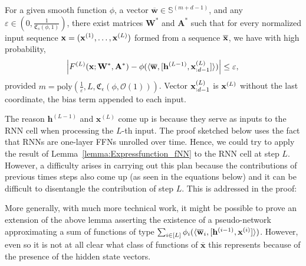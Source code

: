 \begin{lemma}[Informal]\label{lemma:Expressfunction_RNN}
	For a given smooth function $\phi$, a vector $\overline{\mathbf{w}} \in \mathbb{S}^{(m+d-1)}$, and any $\varepsilon \in \left(0, \frac{1}{\mathfrak{C}_{s}\left(\phi, 1 \right)}\right)$, there exist matrices $\mathbf{W}^{\ast}$ and $\mathbf{A}^{\ast}$ such that for every normalized input sequence $\mathbf{x} = (\mathbf{x}^{(1)}, \ldots, \mathbf{x}^{(L)})$ formed from a sequence $\overline{\mathbf{x}}$, we have with high probability,
	\begin{align*}
	    \abs{F^{(L)}(\mathbf{x}; \mathbf{W}^{\ast}, \mathbf{A}^{\ast}) - \phi({\langle  \overline{\mathbf{w}}, [\mathbf{h}^{(L-1)}, \mathbf{x}^{(L)}_{:d-1}]\rangle})} \le \varepsilon,
	\end{align*}
	provided $m = \mathrm{poly}(\frac{1}{\varepsilon}, L, \mathfrak{C}_{\epsilon}(\phi, \mathcal{O}(1)))$. Vector $\mathbf{x}^{(L)}_{:d-1}$ is 
	$\mathbf{x}^{(L)}$ without the last coordinate, the bias term appended to each input.
\end{lemma} 
The reason $\mathbf{h}^{(L-1)}$ and $\mathbf{x}^{(L)}$ come up is because they serve as inputs to the RNN cell when processing the $L$-th input. The proof sketched below uses the fact that RNNs are one-layer FFNs unrolled over time. Hence, we could try to apply the result of Lemma~\ref{lemma:Expressfunction_fNN} to the RNN cell at step $L$. However, a difficulty arises in carrying out this plan because the contributions of previous times steps also come up (as seen in the equations below) and it can be difficult to disentangle the contribution of step $L$. This is addressed in the proof: 

\begin{prf}%
    
\end{prf}
More generally, with much more technical work, it might be possible to prove an extension of the above lemma asserting the existence of a pseudo-network approximating a sum of functions of type $\sum_{i \in [L]}\phi_i({\langle  \overline{\mathbf{w}}_i, [\mathbf{h}^{(i-1)}, \mathbf{x}^{(i)}]\rangle})$. However, even so it is not at all clear what class of functions of $\overline{\mathbf{x}}$ this represents because of the presence of the hidden state vectors. 


